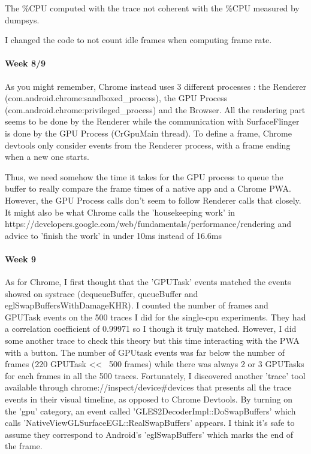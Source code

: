 \documentclass{kththesis}
\begin{document}
The \%CPU computed with the trace not coherent with the \%CPU measured by dumpsys.

I changed the code to not count idle frames when computing frame rate. 
\newline

\paragraph{Week 8/9}
As you might remember, Chrome instead uses 3 different processes : the Renderer (com.android.chrome:sandboxed\_process), the GPU Process (com.android.chrome:privileged\_process) and the Browser. All the rendering part seems to be done by the Renderer while the communication with SurfaceFlinger is done by the GPU Process (CrGpuMain thread). To define a frame, Chrome devtools only consider events from the Renderer process, with a frame ending when a new one starts.

Thus, we need somehow the time it takes for the GPU process to queue the buffer to really compare the frame times of a native app and a Chrome PWA. However, the GPU Process calls don't seem to follow Renderer calls that closely. It might also be what Chrome calls the 'housekeeping work' in https://developers.google.com/web/fundamentals/performance/rendering and advice to 'finish the work' in under 10ms instead of 16.6ms

\paragraph{Week 9}
As for Chrome, I first thought that the 'GPUTask' events matched the events showed on systrace (dequeueBuffer, queueBuffer and eglSwapBuffersWithDamageKHR). I counted the number of frames and GPUTask events on the 500 traces I did for the single-cpu experiments. They had a correlation coefficient of 0.99971 so I though it truly matched.
However, I did some another trace to check this theory but this time interacting with the PWA with a button. The number of GPUtask events was far below the number of frames (220 GPUTask << ~500 frames) while there was always 2 or 3 GPUTasks for each frames in all the 500 traces.
Fortunately, I discovered another 'trace' tool available through chrome://inspect/device{\#}devices that presents all the trace events in their visual timeline, as opposed to Chrome Devtools. By turning on the 'gpu' category, an event called 'GLES2DecoderImpl::DoSwapBuffers' which calls 'NativeViewGLSurfaceEGL::RealSwapBuffers' appears. I think it's safe to assume they correspond to Android's 'eglSwapBuffers' which marks the end of the frame.
\end{document}
